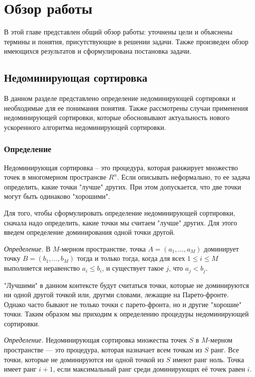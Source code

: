 
\chapter{Обзор работы}
\label{chapter1}

В этой главе представлен общий обзор работы: уточнены цели и объяснены термины и понятия, присутствующие в решении
задачи. Также произведен обзор имеющихся результатов и сформулирована постановка задачи.

\section{Недоминирующая сортировка}

В данном разделе представлено определение недоминирующей сортировки и необходимые для ее понимания понятия.
Также рассмотрены случаи применения недоминирующей сортировки, которые обосновывают актуальность нового ускоренного
алгоритма недоминирующей сортировки.

\subsection{Определение}

Недоминирующая сортировка -- это процедура, которая ранжирует множество точек в многомерном пространсве $R^n$.
Если описывать неформально, то ее задача определить, какие точки "лучше" других. При этом допускается, что две точки
могут быть одинаково "хорошими".

Для того, чтобы сформулировать определение недоминирующей сортировки, сначала надо определить, какие точки мы считаем 
"лучше" других. Для этого введем определение доминирования одной точки другой.

\textit{Определение.} В $M$-мерном пространстве, точка $A = (a_1,...,a_M)$ доминирует точку $B = (b_1,...,b_M)$
 тогда и только тогда, когда для всех $1 \leq i \leq M$ выполняется неравенство $a_i\leq b_i$, и существует такое $j$,
 что $a_j < b_j$.

"Лучшими" в данном контексте будут считаться точки, которые не доминируются ни одной другой точкой или, другми словами,
лежащие на Парето-фронте. Однако часто бывают не только точки с парето-фронта, но и другие "хорошие" точки. Таким
образом мы приходим к определению процедуры недоминирующей сортировки.

\textit{Определение.} Недоминирующая сортировка множества точек $S$ в $M$-мерном пространстве — это процедура, которая 
назначает всем точкам из $S$ ранг. Все точки, которые не доминируются ни одной точкой из $S$ имеют ранг ноль. Точка 
имеет ранг $i+1$, если максимальный ранг среди доминирующих её точек равен $i$.

